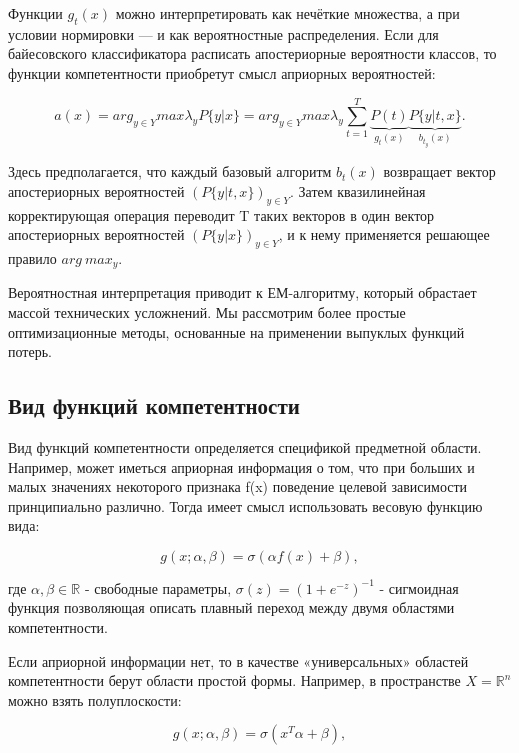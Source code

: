 \documentclass{article}
\begin{document}
Функции $g_{t}(x)$ можно интерпретировать как
нечёткие множества, а при условии нормировки — и как вероятностные распределения. Если для байесовского классификатора расписать апостериорные вероятности
классов, то функции компетентности приобретут смысл априорных вероятностей:

\begin{equation*}
    a(x) = arg_{y\in Y} max \lambda_{y} P\{y|x\} = arg_{y\in Y} max \lambda_{y} \sum_{t=1}^{T} \underbrace{P(t)}_{g_{t}(x)} \underbrace{P\{y|t, x\}}_{b_{t_{y}}(x)}.
\end{equation*}

Здесь предполагается, что каждый базовый алгоритм $b_{t}(x)$ возвращает вектор апостериорных вероятностей $(P\{y|t, x\})_{y\in Y}$. Затем квазилинейная корректирующая операция переводит T таких векторов в один вектор апостериорных вероятностей $(P\{y| x\})_{y\in Y}$, и к нему применяется решающее правило $arg\:max_{y}$.


Вероятностная интерпретация приводит к ЕМ-алгоритму, который обрастает массой технических усложнений. Мы рассмотрим более простые оптимизационные методы, основанные на применении выпуклых функций потерь.

\subsection{Вид функций компетентности}


Вид функций компетентности определяется спецификой предметной области. Например, может иметься априорная информация о том, что при больших и малых значениях некоторого признака f(x) поведение целевой зависимости принципиально различно. Тогда имеет смысл использовать весовую функцию вида:

\begin{equation*}
    g(x;\alpha, \beta) = \sigma(\alpha f(x) + \beta),
\end{equation*}

где $\alpha, \beta \in \mathbb{R}$ - свободные параметры, $\sigma(z) = (1 + e^{-z})^{-1}$ - сигмоидная функция позволяющая описать плавный переход между двумя областями компетентности.


Если априорной информации нет, то в качестве «универсальных» областей компетентности берут области простой формы. Например, в пространстве $X = \mathbb{R}^{n}$ можно взять полуплоскости:

\begin{equation*}
    g(x;\alpha, \beta) = \sigma(x^{T}\alpha + \beta),
\end{equation*}
\end{document}
